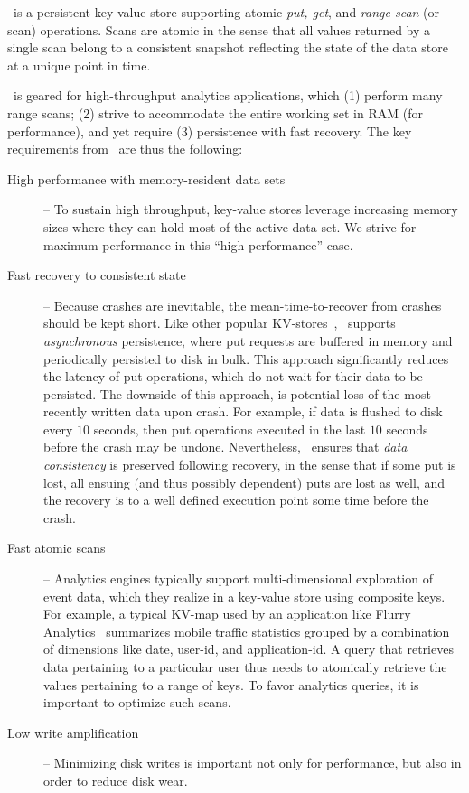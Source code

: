 

\sys\ is a persistent key-value store supporting atomic \emph{put, get}, and  \emph{range scan} (or scan) operations. 
Scans are atomic in the sense that all values returned by a single scan belong to a consistent snapshot reflecting
the state of the data store at a unique point in time.




\sys\ is geared for high-throughput analytics applications, which (1) perform many range scans; 
(2) strive to accommodate the entire working set in RAM (for performance), and yet require  (3)
persistence with fast recovery. 
The key requirements from \sys\ are thus the following:
\begin{description}
\item[High performance with memory-resident data sets] -- 
To sustain high throughput, key-value stores leverage increasing memory sizes where they can hold most of the active data set. 
We strive for maximum performance in this ``high performance'' case.  
\item[Fast recovery to consistent state] --  Because crashes are inevitable, the mean-time-to-recover from crashes should be kept short.
Like other popular KV-stores~\cite{rocksdb,leveldb,hbase}, \sys\ supports \emph{asynchronous} persistence, 
where put requests are buffered in memory and periodically persisted to disk in bulk. 
This approach significantly reduces the latency of put operations, which do not wait for their data to be persisted.
The downside of this approach, is potential loss of the most recently written data upon crash. For example, 
if data is flushed to disk every $10$ seconds, then put operations executed in the last $10$ seconds before the crash 
may be undone. 
Nevertheless, \sys\ ensures that \emph{data consistency} is preserved following recovery, in the sense that 
if some put is lost, all ensuing (and thus possibly dependent) puts are lost as well, and the recovery is to a well 
defined execution point some time before the crash.
 
 \item[Fast atomic scans] -- 
 Analytics engines typically support multi-dimensional exploration of event data, which they realize in a key-value store using composite keys.   For example, a typical  KV-map used by an application like Flurry Analytics~\cite{flurry} 
  summarizes mobile traffic statistics grouped by a combination of dimensions like  date,  user-id, and application-id.
A query that retrieves data pertaining to a particular user thus needs to atomically 
retrieve the values pertaining to a range of keys. 
 To favor analytics queries, it is important to optimize  such scans. 
 \item[Low write amplification] -- Minimizing disk writes is important not only for performance, but also in order to reduce disk wear.


\end{description}
